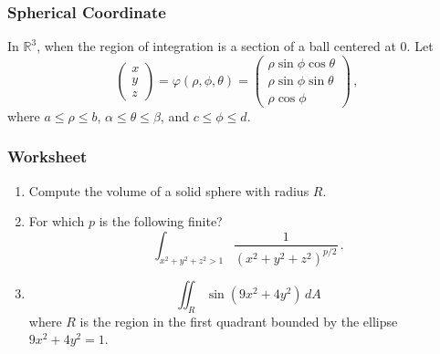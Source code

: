 \documentclass[aspectratio=169]{beamer}
\newcommand{\R}{\mathbb{R}}
\begin{document}
\begin{frame}
    \frametitle{Spherical Coordinate}
    In $\R^3$, when the region of integration is a section of a ball centered at $0$.
    Let
    \begin{equation*}
        \begin{pmatrix}
            x \\ y \\z
        \end{pmatrix}
        =
        \varphi(\rho,\phi,\theta) = 
        \begin{pmatrix}
            \rho\sin\phi\cos\theta\\
            \rho\sin\phi\sin\theta\\
            \rho \cos\phi
        \end{pmatrix} \,,
    \end{equation*}
where $a \leq \rho \leq b$, $\alpha \leq \theta \leq \beta$, and 
$c \leq \phi \leq d$.
\end{frame}

\begin{frame}
    \frametitle{Worksheet}
    \begin{enumerate}
        \item Compute the volume of a solid sphere with radius $R$.
        \item For which $p$ is the following finite?
            \begin{equation*}
                \int_{x^2 + y^2 + z^2 > 1} \frac{1}{(x^2 + y^2 + z^2)^{p/2}} \,.
            \end{equation*}
        \item 
            \begin{equation*}
                \iint_R \sin(9x^2 + 4y^2) \, dA
            \end{equation*}
            where $R$ is the region in the first quadrant bounded
            by the ellipse $9x^2 + 4y^2 = 1$.
    \end{enumerate}
\end{frame}
\end{document}
